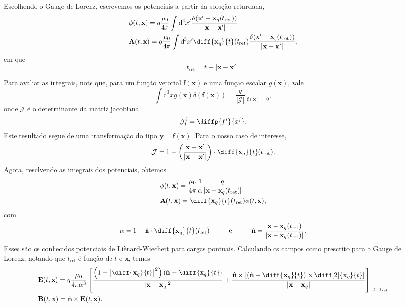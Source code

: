 \documentclass[12pt]{article}
\newcommand{\dd}{\mathrm{d}}
\newcommand{\x}{\mathbf{x}}
\newcommand{\xq}{\mathbf{x}_q}
\newcommand{\tr}{t_{\text{ret}}}
\newcommand{\n}{\mathbf{n}}
\begin{document}
Escolhendo o Gauge de Lorenz, escrevemos os potenciais a partir da solução retardada,
\begin{subequations}
    \begin{align}
        &\phi(t,\x)=q\frac{\mu_0}{4\pi}\int\dd^3x'\frac{\delta(\x'-\xq(\tr))}{\lvert\x-\x'\rvert}\\
        &\mathbf{A}(t,\x)=q\frac{\mu_0}{4\pi}\int\dd^3x'\diff{\xq}{t}(\tr)\frac{\delta(\x'-\xq(\tr))}{\lvert\x-\x'\rvert},
    \end{align}
\end{subequations}
em que
\begin{equation}
    \tr=t-\lvert\x-\x'\rvert.
\end{equation}

Para avaliar as integrais, note que, para um função vetorial \(\mathbf{f}(\x)\) e uma função escalar \(g(\x)\), vale 
\begin{equation}
    \int\dd^3xg(\x)\delta(\mathbf{f}(\x))=\frac{g}{\lvert\mathcal{J}\rvert}\bigg\vert_{\mathbf{f}(\x)=0},
\end{equation}
onde \(\mathcal{J}\) é o determinante da matriz jacobiana
\begin{equation}
    \mathcal{J}^i_j=\diffp{f^i}{x^j}.
\end{equation}
Este resultado segue de uma transformação do tipo \(\mathbf{y}=\mathbf{f}(\x)\). Para o nosso caso de interesse,
\begin{equation}
    \mathcal{J}=1-\left(\frac{\x-\x'}{\lvert\x-\x'\rvert}\right)\cdot\diff{\xq}{t}(\tr).
\end{equation}
Agora, resolvendo as integrais dos potenciais, obtemos
\begin{subequations}
    \begin{align}
        &\phi(t,\x)=\frac{\mu_0}{4\pi}\frac{1}{\alpha}\frac{q}{\lvert\x-\xq(\tr)\rvert}\\
        &\mathbf{A}(t,\x)=\diff{\xq}{t}(\tr)\phi(t,\x),
    \end{align}
\end{subequations}
com
\begin{equation}
    \alpha=1-\hat{\mathbf{n}}\cdot\diff{\xq}{t}(\tr)\hspace{1cm}\text{e}\hspace{1cm}\hat{\mathbf{n}}=\frac{\x-\xq(\tr)}{\lvert\x-\xq(\tr)\rvert}.
\end{equation}
Esses são os conhecidos potenciais de Liènard-Wiechert para cargas pontuais. Calculando os campos como prescrito para o Gauge de Lorenz, notando que \(\tr\) é função de \(t\) e \(\x\), temos
\begin{subequations}
    \begin{align}
        &\mathbf{E}(t,\x)=q\frac{\mu_0}{4\pi\alpha^3}\left[\frac{\left(1-\big\lvert\diff{\xq}{t}\big\rvert^2\right)\left(\hat{\mathbf{n}}-\diff{\xq}{t}\right)}{\lvert\x-\xq\rvert^2}+\frac{\hat{\n}\times\left[\left(\hat{\n}-\diff{\xq}{t}\right)\times\diff[2]{\xq}{t}\right]}{\lvert\x-\xq\rvert}\right]\Bigg\rvert_{t=\tr}\\
        &\mathbf{B}(t,\x)=\hat{\n}\times\mathbf{E}(t,\x).
    \end{align}
    \label{eq:campos}
\end{subequations}
\end{document}
